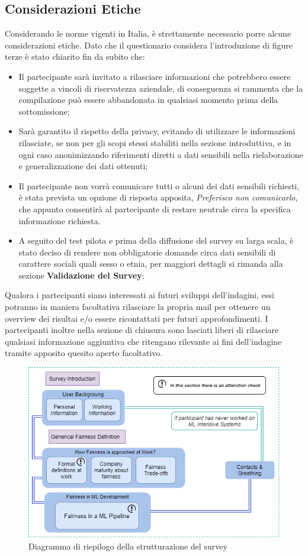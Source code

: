     \subsection{Considerazioni Etiche}
    
    Considerando le norme vigenti in Italia, è strettamente necessario porre alcune considerazioni etiche.
    Dato che il questionario considera l'introduzione di figure terze è stato chiarito fin da subito che:
    \begin{itemize}
        \item  Il partecipante sarà invitato a rilasciare informazioni che potrebbero essere soggette a vincoli di riservatezza aziendale, di conseguenza si rammenta che la compilazione può essere abbandonata in qualsiasi momento prima della sottomissione;
        \item Sarà garantito il rispetto della privacy, evitando di utilizzare le informazioni rilasciate, se non per gli scopi stessi stabiliti nella sezione introduttiva, e in ogni caso anonimizzando  riferimenti diretti a dati sensibili nella rielaborazione e generalizzazione dei dati ottenuti;
        \item Il partecipante non vorrà comunicare tutti o alcuni dei dati sensibili richiesti, è stata prevista un opzione di risposta apposita, \emph{Preferisco non comunicarlo}, che appunto consentirà al partecipante di restare neutrale circa la specifica informazione richiesta.
        \item A seguito del test pilota e prima della diffusione del survey su larga scala, è stato deciso di rendere non obbligatorie domande circa dati sensibili di carattere sociali quali sesso o etnia, per maggiori dettagli si rimanda alla sezione \textbf{Validazione del Survey};
    \end{itemize}
    
    Qualora i partecipanti siano interessati ai futuri sviluppi dell'indagini, essi potranno in maniera facoltativa rilasciare la propria mail per ottenere un overview dei risultai e/o essere ricontattati per futuri approfondimenti. I partecipanti inoltre nella sezione di chiusura sono lasciati liberi di rilasciare qualsiasi informazione aggiuntiva che ritengano rilevante ai fini dell'indagine tramite apposito quesito aperto facoltativo.
    
    
    \begin{figure}
        \centering
        \includegraphics[width=1\textwidth]{figure/Survey Structural diagram.png}
        \caption{Diagramma di riepilogo della strutturazione del survey}
    \end{figure}
   

\newpage
